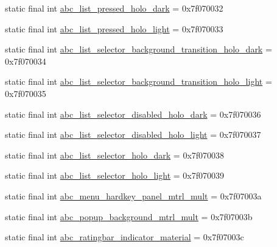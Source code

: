 \begin{DoxyCompactItemize}
\item 
static final int \mbox{\hyperlink{classandroid_1_1support_1_1design_1_1R_1_1drawable_ab1e6fcec42423709d799d8f6a7e21059}{abc\+\_\+list\+\_\+pressed\+\_\+holo\+\_\+dark}} = 0x7f070032
\item 
static final int \mbox{\hyperlink{classandroid_1_1support_1_1design_1_1R_1_1drawable_ab0cef3e2b1fc7aa0bf2c1988bfeaca30}{abc\+\_\+list\+\_\+pressed\+\_\+holo\+\_\+light}} = 0x7f070033
\item 
static final int \mbox{\hyperlink{classandroid_1_1support_1_1design_1_1R_1_1drawable_a7f756d25e913e1c3d2bd87d82265fb46}{abc\+\_\+list\+\_\+selector\+\_\+background\+\_\+transition\+\_\+holo\+\_\+dark}} = 0x7f070034
\item 
static final int \mbox{\hyperlink{classandroid_1_1support_1_1design_1_1R_1_1drawable_acdc506ea7e02796a9ad1948d4e592b75}{abc\+\_\+list\+\_\+selector\+\_\+background\+\_\+transition\+\_\+holo\+\_\+light}} = 0x7f070035
\item 
static final int \mbox{\hyperlink{classandroid_1_1support_1_1design_1_1R_1_1drawable_a94c12f905a060bba7d244eed598e1461}{abc\+\_\+list\+\_\+selector\+\_\+disabled\+\_\+holo\+\_\+dark}} = 0x7f070036
\item 
static final int \mbox{\hyperlink{classandroid_1_1support_1_1design_1_1R_1_1drawable_aeb140628ca835dff330e6f2e32de04a7}{abc\+\_\+list\+\_\+selector\+\_\+disabled\+\_\+holo\+\_\+light}} = 0x7f070037
\item 
static final int \mbox{\hyperlink{classandroid_1_1support_1_1design_1_1R_1_1drawable_a8aa940b01e43683a84407c10ca9ff622}{abc\+\_\+list\+\_\+selector\+\_\+holo\+\_\+dark}} = 0x7f070038
\item 
static final int \mbox{\hyperlink{classandroid_1_1support_1_1design_1_1R_1_1drawable_a928d3309d523c1fffb1ce9477b7c9b72}{abc\+\_\+list\+\_\+selector\+\_\+holo\+\_\+light}} = 0x7f070039
\item 
static final int \mbox{\hyperlink{classandroid_1_1support_1_1design_1_1R_1_1drawable_a338da0e1d3f5fe94baec6d62b4af2673}{abc\+\_\+menu\+\_\+hardkey\+\_\+panel\+\_\+mtrl\+\_\+mult}} = 0x7f07003a
\item 
static final int \mbox{\hyperlink{classandroid_1_1support_1_1design_1_1R_1_1drawable_a44c8316321e929db60908ab6003732f7}{abc\+\_\+popup\+\_\+background\+\_\+mtrl\+\_\+mult}} = 0x7f07003b
\item 
static final int \mbox{\hyperlink{classandroid_1_1support_1_1design_1_1R_1_1drawable_ae24e6883b3e33d0e1268295286114968}{abc\+\_\+ratingbar\+\_\+indicator\+\_\+material}} = 0x7f07003c

\end{DoxyCompactItemize}
